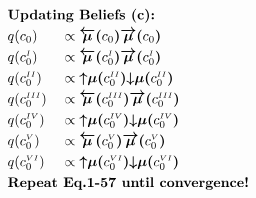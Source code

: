 \documentclass[fleqn]{article}
\begin{document}
\begin{minipage}[t]{0.5\textwidth}
    \begin{alignat}{2}
         & \rlap{\text{\bfseries Updating Beliefs (c):}} \nonumber                                                                                                                                                   \\
         & q(c_0)                                                              &  & \propto \bm{\overleftarrow{\mu}(}c_0\bm{)} \bm{\overrightarrow{\mu}(}c_0\bm{)}                                                   \\
         & q(c^{\scriptscriptstyle I}_0)                                       &  & \propto \bm{\overleftarrow{\mu}(}c^{\scriptscriptstyle I}_0\bm{)} \bm{\overrightarrow{\mu}(}c^{\scriptscriptstyle I}_0\bm{)}     \\
         & q(c^{\scriptscriptstyle II}_0)                                      &  & \propto \bm{{\uparrow}{\mu}(}c^{\scriptscriptstyle II}_0\bm{)} \bm{{\downarrow}{\mu}(}c^{\scriptscriptstyle II}_0\bm{)}          \\
         & q(c^{\scriptscriptstyle III}_0)                                     &  & \propto \bm{\overleftarrow{\mu}(}c^{\scriptscriptstyle III}_0\bm{)} \bm{\overrightarrow{\mu}(}c^{\scriptscriptstyle III}_0\bm{)} \\
         & q(c^{\scriptscriptstyle IV}_0)                                      &  & \propto \bm{{\uparrow}{\mu}(}c^{\scriptscriptstyle IV}_0\bm{)} \bm{{\downarrow}{\mu}(}c^{\scriptscriptstyle IV}_0\bm{)}          \\
         & q(c^{\scriptscriptstyle V}_0)                                       &  & \propto \bm{\overleftarrow{\mu}(}c^{\scriptscriptstyle V}_0\bm{)} \bm{\overrightarrow{\mu}(}c^{\scriptscriptstyle V}_0\bm{)}     \\
         & q(c^{\scriptscriptstyle VI}_0)                                      &  & \propto \bm{{\uparrow}{\mu}(}c^{\scriptscriptstyle VI}_0\bm{)} \bm{{\downarrow}{\mu}(}c^{\scriptscriptstyle VI}_0\bm{)}          \\
         & \rlap{\text{\bfseries Repeat Eq.1-57 until convergence!}} \nonumber
    \end{alignat}
\end{minipage}
\end{document}
